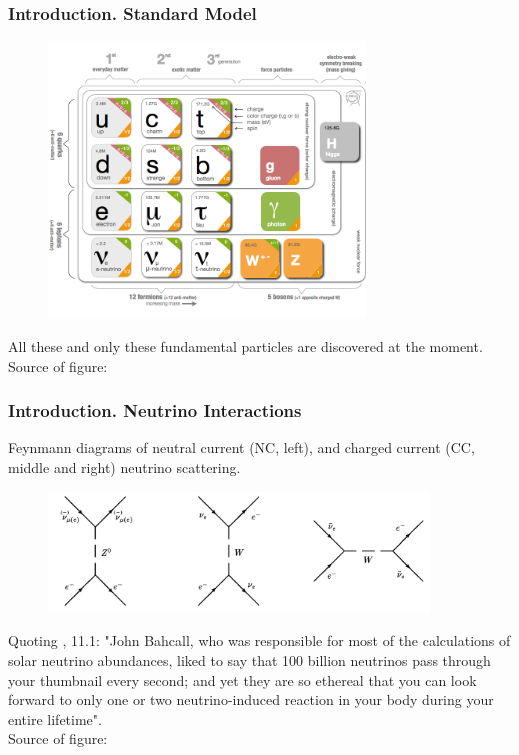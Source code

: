 \begin{frame}\frametitle{Introduction. Standard Model}
\begin{figure}
\label{fig:StandardModel}
\centering 
\includegraphics[width=0.75\textwidth, keepaspectratio=true]{figs/StandardModel.png}
\end{figure}
\tiny
All these and only these fundamental particles are discovered at the moment. Source of figure: \cite{ref_fig_StandardModel}
\end{frame}

\begin{frame}\frametitle{Introduction. Neutrino Interactions}
\scriptsize
Feynmann diagrams of neutral current (NC, left), and charged current (CC, middle and right) neutrino scattering.
\begin{figure}
\label{fig:NuScattering}
\centering
\includegraphics[width=0.90\textwidth, keepaspectratio=true]{figs/neutrinoScattering.png}
\end{figure}
Quoting \cite{ref_Griffiths}, 11.1: "John Bahcall, who was responsible for most of the calculations of solar neutrino abundances, liked to say that 100 billion neutrinos pass through your thumbnail every second; and yet they are so ethereal that you can look forward to only one or two neutrino-induced reaction in your body during your entire lifetime".\\
\tiny
Source of figure: \cite{ref_fig_neutrinoScattering}
\end{frame}

